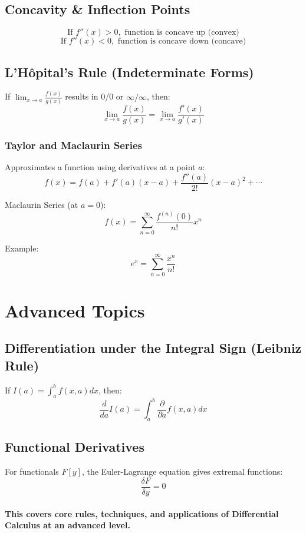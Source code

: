 \documentclass{article}
\begin{document}
\subsection{Concavity \& Inflection Points}
\[
\text{If } f''(x) > 0, \text{ function is concave up (convex)}
\]
\[
\text{If } f''(x) < 0, \text{ function is concave down (concave)}
\]

\subsection{L'Hôpital’s Rule (Indeterminate Forms)}

If \( \lim_{x \to a} \frac{f(x)}{g(x)} \) results in 0/0 or \( \infty/\infty \),  
then:
\[
\lim_{x \to a} \frac{f(x)}{g(x)} = \lim_{x \to a} \frac{f'(x)}{g'(x)}
\]

\subsubsection{Taylor and Maclaurin Series}

Approximates a function using derivatives at a point \( a \):
\[
f(x) = f(a) + f'(a)(x-a) + \frac{f''(a)}{2!} (x-a)^2 + \cdots
\]

Maclaurin Series (at \( a = 0 \)):
\[
f(x) = \sum_{n=0}^{\infty} \frac{f^{(n)}(0)}{n!} x^n
\]

Example:  
\[
e^x = \sum_{n=0}^{\infty} \frac{x^n}{n!}
\]

\newpage
\section{Advanced Topics}

\subsection{Differentiation under the Integral Sign (Leibniz Rule)}

If \( I(a) = \int_{a}^{b} f(x, a) dx \), then:
\[
\frac{d}{da} I(a) = \int_{a}^{b} \frac{\partial}{\partial a} f(x, a) dx
\]

\subsection{Functional Derivatives  }

For functionals \( F[y] \), the Euler-Lagrange equation gives extremal functions:
\[
\frac{\delta F}{\delta y} = 0
\]
\newpage
\paragraph{This covers core rules, techniques, and applications of Differential Calculus at an advanced level.}
\end{document}
